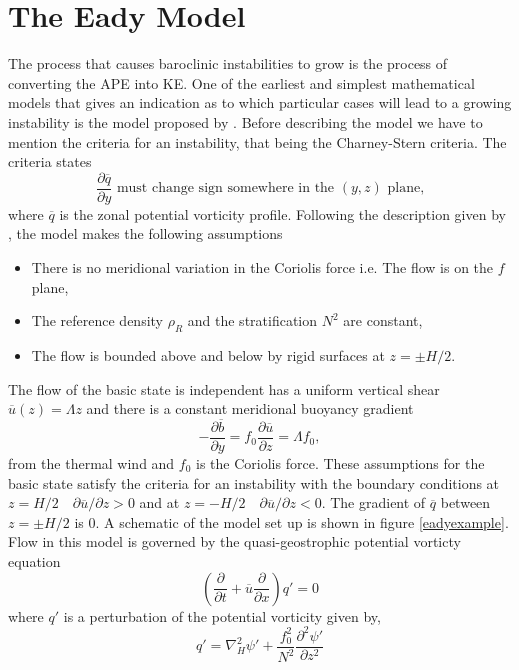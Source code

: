 \documentclass{article}
\begin{document}
\section{The Eady Model}
The process that causes baroclinic instabilities to grow is the process of converting the APE into KE. One of the earliest and simplest mathematical models that gives an indication as to which particular cases will lead to a growing instability is the model proposed by \cite{Eady1949}. Before describing the model we have to mention the criteria for an instability, that being the Charney-Stern criteria. The criteria states 
$$\frac{\partial\overline{q}}{\partial y}\text{ must change sign somewhere in the }(y,z)\text{ plane,} $$
where $\overline{q}$ is the zonal potential vorticity profile. 
Following the description given by \cite{Hoskins2013}, the model makes the following assumptions
\begin{itemize}
  \item There is no meridional variation in the Coriolis force i.e. The flow is on the $f$ plane,
  \item The reference density $\rho_R$ and the stratification $N^2$ are constant,
  \item The flow is bounded above and below by rigid surfaces at $z=\pm H/2$. 
\end{itemize}
The flow of the basic state is independent has a uniform vertical shear $\overline{u}(z) = \Lambda z$ and there is a constant meridional buoyancy gradient 
\begin{equation}
  -\frac{\partial\overline{b}}{\partial y} = f_0\frac{\partial\overline{u}}{\partial z}= \Lambda f_0,
\end{equation}
from the thermal wind and $f_0$ is the Coriolis force. These assumptions for the basic state satisfy the criteria for an instability with the boundary conditions at $ z= H/2 \quad \partial\overline u/\partial z > 0$ and at $ z= -H/2 \quad \partial\overline{u}/\partial z < 0$. The gradient of $\overline{q}$ between $z=\pm H/2$ is 0. A schematic of the model set up is shown in figure \ref{eadyexample}. Flow in this model is governed by the quasi-geostrophic potential vorticty equation
\begin{equation}
  \left(\frac{\partial}{\partial t} +\overline{u}\frac{\partial}{\partial x}\right)q' = 0 
\end{equation}
where $q'$ is a perturbation of the potential vorticity given by,
\begin{equation}
  q' = \nabla^2_{H} \psi' +\frac{f_0^2}{N^2}\frac{\partial^2\psi'}{\partial z^2}
\end{equation}
\end{document}
